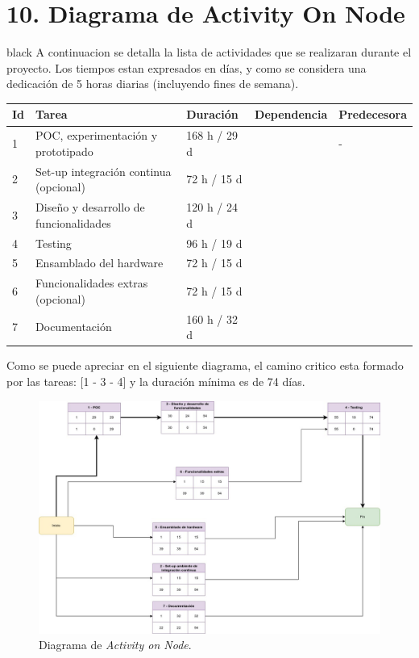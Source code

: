 \documentclass[
11pt, %
codirector, %
]{charter}
\begin{document}
\section{10. Diagrama de Activity On Node}
\label{sec:AoN}

\begin{consigna}{black}
A continuacion se detalla la lista de actividades que se realizaran durante el proyecto. Los tiempos estan expresados en días, y como se considera una dedicación de 5 horas diarias (incluyendo fines de semana). 

\begin{table}[ht]
\begin{tabularx}{\linewidth}{@{}|l|X|l|l|l|@{}}
\hline
\rowcolor[HTML]{C0C0C0} 
Id	& Tarea           										& Duración 				 	& Dependencia	& Predecesora 	\\ \hline

1	& POC, experimentación y prototipado					& 168 h / 29 d			& 				&  -      		\\ \hline
2	& Set-up integración continua (opcional)				& 72 h / 15 d   			&         		&  				\\ \hline
3	& Diseño y desarrollo de funcionalidades    			& 120 h / 24 d				& 			 	&  				\\ \hline
4	& Testing								    			& 96 h / 19 d				& 				&  				\\ \hline
5	& Ensamblado del hardware				    			& 72 h / 15 d				& 				&  				\\ \hline
6	& Funcionalidades extras (opcional)						& 72 h / 15 d				& 				&  				\\ \hline
7	& Documentación    										& 160 h / 32 d				& 			 	&  				\\ \hline

\end{tabularx}
\end{table}


Como se puede apreciar en el siguiente diagrama, el camino critico esta formado por las tareas: [1 - 3 - 4] y la duración mínima es de 74 días.


\begin{figure}[htpb]
\centering 
\includegraphics[width=.9\textwidth]{./Figuras/ProyectoFinal-Page-8.jpg}
\caption{Diagrama de \textit{Activity on Node}.}
\label{fig:diagBloques}
\end{figure}
\end{consigna}
\end{document}
